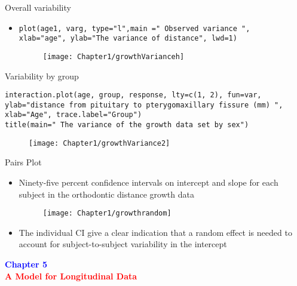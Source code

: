 \documentclass{beamer}
\begin{document}
\begin{frame}[fragile]{Overall variability}
\begin{itemize}
	\item {\color{red}{R code}}
	\begin{verbatim}
plot(age1, varg, type="l",main =" Observed variance ",
xlab="age", ylab="The variance of distance", lwd=1)
	\end{verbatim}	
	\begin{figure}[h!]
		\centering
		\texttt{[image: Chapter1/growthVarianceh]}
	\end{figure}
\end{itemize}
\end{frame}


\begin{frame}[fragile]{Variability by group}
	\begin{verbatim}
interaction.plot(age, group, response, lty=c(1, 2), fun=var,
ylab="distance from pituitary to pterygomaxillary fissure (mm) ",
xlab="Age", trace.label="Group")
title(main=" The variance of the growth data set by sex")
	\end{verbatim}	
	\begin{figure}[h!]
		\centering
		\texttt{[image: Chapter1/growthVariance2]}
	\end{figure}
\end{frame}


\begin{frame}{Pairs Plot}
\begin{itemize}
	\item Ninety-five percent confidence intervals on intercept and slope for each subject in the orthodontic distance growth data
	\begin{figure}[h!]
		\centering
		\texttt{[image: Chapter1/growthrandom]}
	\end{figure}
	\item The individual CI give a clear indication that a random effect is needed to account for subject-to-subject variability in the intercept
\end{itemize}
\end{frame}


\begin{frame}
\centering
\Large
\textbf{\textcolor{blue} {Chapter 5}}\\
\vspace*{3mm}
\textbf{\textcolor{red} {A Model for Longitudinal Data}}
\end{frame}
\end{document}
